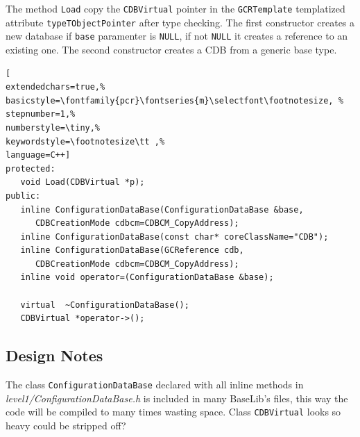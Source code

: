 The method \texttt{Load} copy the \texttt{CDBVirtual} pointer in the \texttt{GCRTemplate} templatized attribute \texttt{typeTObjectPointer} after type checking. The first constructor
 creates a new database if \texttt{base} paramenter is \texttt{NULL}, if not \texttt{NULL} it creates a reference to an existing one. The second constructor creates a CDB from a generic base type.

\begin{lstlisting}[
extendedchars=true,%
basicstyle=\fontfamily{pcr}\fontseries{m}\selectfont\footnotesize, %
stepnumber=1,%
numberstyle=\tiny,%
keywordstyle=\footnotesize\tt ,%
language=C++]
protected:
   void Load(CDBVirtual *p);
public:
   inline ConfigurationDataBase(ConfigurationDataBase &base,
      CDBCreationMode cdbcm=CDBCM_CopyAddress);
   inline ConfigurationDataBase(const char* coreClassName="CDB");
   inline ConfigurationDataBase(GCReference cdb,
      CDBCreationMode cdbcm=CDBCM_CopyAddress);
   inline void operator=(ConfigurationDataBase &base);

   virtual  ~ConfigurationDataBase();
   CDBVirtual *operator->();
\end{lstlisting}



\subsection{Design Notes}
The class \texttt{ConfigurationDataBase} declared with all inline methods in \textit{level1/ConfigurationDataBase.h} is included in many BaseLib's files, this way the code will be compiled to many times wasting space. Class \texttt{CDBVirtual} looks so heavy could be stripped off?
